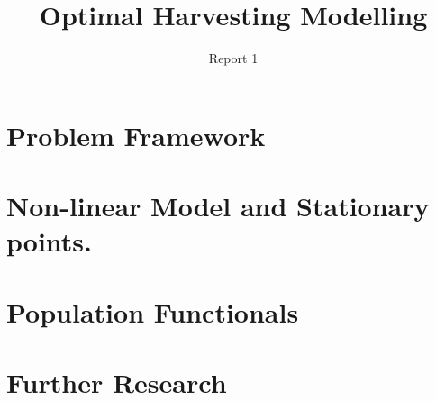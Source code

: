 \documentclass[twoside,colorback,accentcolor=tud4c,11pt]{tudreport}
\title{Optimal Harvesting Modelling}
\subtitle{Report 1}
\begin{document}
\maketitle
\begin{abstract}

\end{abstract}  

\tableofcontents

\chapter{Problem Framework}\label{chap:Problem Framework}

\chapter{Non-linear Model and Stationary points.} \label{chap: Deterministic Model}

\chapter{Population Functionals}\label{chap: Population Functional}

\chapter{Further Research}\label{chap: Further Enhancements}

\end{document}
